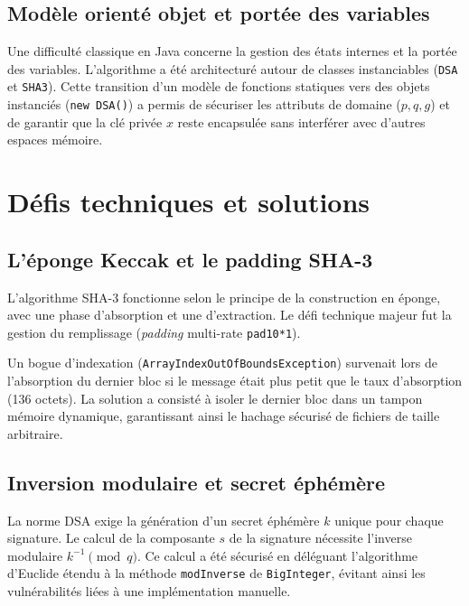 \documentclass[12pt,a4paper]{article}
\begin{document}
\subsection{Modèle orienté objet et portée des variables}
Une difficulté classique en Java concerne la gestion des états internes et la portée des variables. L'algorithme a été architecturé autour de classes instanciables (\texttt{DSA} et \texttt{SHA3}). Cette transition d'un modèle de fonctions statiques vers des objets instanciés (\texttt{new DSA()}) a permis de sécuriser les attributs de domaine ($p, q, g$) et de garantir que la clé privée $x$ reste encapsulée sans interférer avec d'autres espaces mémoire.


\section{Défis techniques et solutions}

\subsection{L'éponge Keccak et le padding SHA-3}
L'algorithme SHA-3 fonctionne selon le principe de la construction en éponge, avec une phase d'absorption et une d'extraction. Le défi technique majeur fut la gestion du remplissage (\textit{padding} multi-rate \texttt{pad10*1}).

Un bogue d'indexation (\texttt{ArrayIndexOutOfBoundsException}) survenait lors de l'absorption du dernier bloc si le message était plus petit que le taux d'absorption (136 octets). La solution a consisté à isoler le dernier bloc dans un tampon mémoire dynamique, garantissant ainsi le hachage sécurisé de fichiers de taille arbitraire.

\subsection{Inversion modulaire et secret éphémère}
La norme DSA exige la génération d'un secret éphémère $k$ unique pour chaque signature. Le calcul de la composante $s$ de la signature nécessite l'inverse modulaire $k^{-1} \pmod q$. Ce calcul a été sécurisé en déléguant l'algorithme d'Euclide étendu à la méthode \texttt{modInverse} de \texttt{BigInteger}, évitant ainsi les vulnérabilités liées à une implémentation manuelle.
\end{document}

